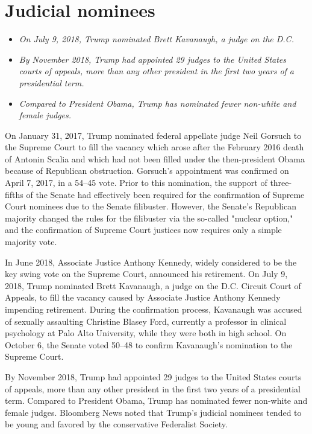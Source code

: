 \section{Judicial nominees}\label{judicial-nominees}

\begin{itemize}
\item
  \emph{On July 9, 2018, Trump nominated Brett Kavanaugh, a judge on the
  D.C.}
\item
  \emph{By November 2018, Trump had appointed 29 judges to the United
  States courts of appeals, more than any other president in the first
  two years of a presidential term.}
\item
  \emph{Compared to President Obama, Trump has nominated fewer non-white
  and female judges.}
\end{itemize}

On January 31, 2017, Trump nominated federal appellate judge Neil
Gorsuch to the Supreme Court to fill the vacancy which arose after the
February 2016 death of Antonin Scalia and which had not been filled
under the then-president Obama because of Republican obstruction.
Gorsuch's appointment was confirmed on April 7, 2017, in a 54--45 vote.
Prior to this nomination, the support of three-fifths of the Senate had
effectively been required for the confirmation of Supreme Court nominees
due to the Senate filibuster. However, the Senate's Republican majority
changed the rules for the filibuster via the so-called "nuclear option,"
and the confirmation of Supreme Court justices now requires only a
simple majority vote.

In June 2018, Associate Justice Anthony Kennedy, widely considered to be
the key swing vote on the Supreme Court, announced his retirement. On
July 9, 2018, Trump nominated Brett Kavanaugh, a judge on the D.C.
Circuit Court of Appeals, to fill the vacancy caused by Associate
Justice Anthony Kennedy impending retirement. During the confirmation
process, Kavanaugh was accused of sexually assaulting Christine Blasey
Ford, currently a professor in clinical psychology at Palo Alto
University, while they were both in high school. On October 6, the
Senate voted 50--48 to confirm Kavanaugh's nomination to the Supreme
Court.

By November 2018, Trump had appointed 29 judges to the United States
courts of appeals, more than any other president in the first two years
of a presidential term. Compared to President Obama, Trump has nominated
fewer non-white and female judges. Bloomberg News noted that Trump's
judicial nominees tended to be young and favored by the conservative
Federalist Society.

